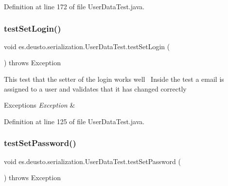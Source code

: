 Definition at line 172 of file User\+Data\+Test.\+java.

\mbox{\label{classes_1_1deusto_1_1serialization_1_1_user_data_test_a3311a4ff455e3d78280ec5da51a01998}} 
\subsubsection{\texorpdfstring{test\+Set\+Login()}{testSetLogin()}}
{\footnotesize\ttfamily void es.\+deusto.\+serialization.\+User\+Data\+Test.\+test\+Set\+Login (\begin{DoxyParamCaption}{ }\end{DoxyParamCaption}) throws Exception}

This test that the setter of the login works well~\newline
Inside the test a email is assigned to a user and validates that it has changed correctly~\newline

\begin{DoxyExceptions}{Exceptions}
{\em Exception} & \\
\hline
\end{DoxyExceptions}


Definition at line 125 of file User\+Data\+Test.\+java.

\mbox{\label{classes_1_1deusto_1_1serialization_1_1_user_data_test_aad240f31ab64b02d0121e4e594185767}} 
\subsubsection{\texorpdfstring{test\+Set\+Password()}{testSetPassword()}}
{\footnotesize\ttfamily void es.\+deusto.\+serialization.\+User\+Data\+Test.\+test\+Set\+Password (\begin{DoxyParamCaption}{ }\end{DoxyParamCaption}) throws Exception}

